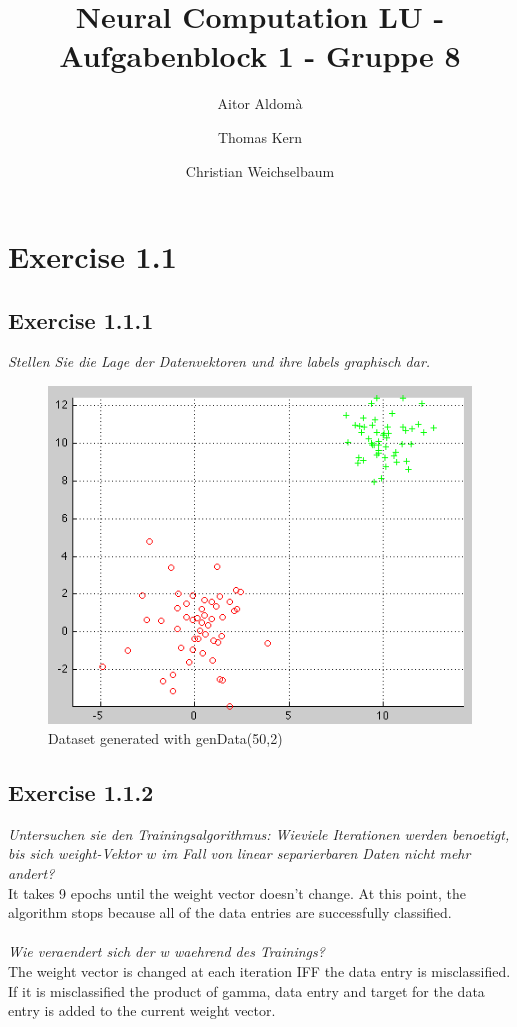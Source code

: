 \documentclass[12pt]{article}
\title{Neural Computation LU - Aufgabenblock 1 - Gruppe 8}
\author{Aitor Aldomà \and Thomas Kern \and Christian Weichselbaum}
\begin{document}
\section{Exercise 1.1}
\subsection{Exercise 1.1.1}
\textit{Stellen Sie die Lage der Datenvektoren und ihre labels graphisch dar.}

\begin{figure}[htp]
	\centering
	\includegraphics[width=1\textwidth]{ab1_1_1}
	\caption{Dataset generated with genData(50,2)}\label{fig:1}
\end{figure}

\subsection{Exercise 1.1.2}

\textit{Untersuchen sie den Trainingsalgorithmus: Wieviele Iterationen werden benoetigt, bis sich weight-Vektor $w$ im Fall von linear separierbaren Daten nicht mehr andert?}
\\
It takes 9 epochs until the weight vector doesn't change. At this point, the algorithm stops because all of the data entries are successfully classified.
\\
\\
\textit{Wie veraendert sich der w waehrend des Trainings?}
\\
The weight vector is changed at each iteration IFF the data entry is misclassified. If it is misclassified the product of gamma, data entry and target for the data entry is added to the current weight vector.
\\
\\
\end{document}
